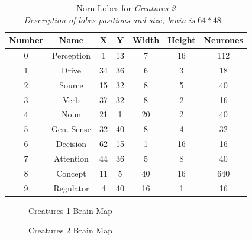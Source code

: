\documentclass[11pt,twoside,a4paper]{article}
\begin{document}
\begin{table}[ht]
	\begin{center} \begin{scriptsize}
	\begin{tabular}{|c|c|c|c|c|c|c|}
		\hline
	\rowcolor[gray]{0.75} 
	Number	&	Name	&	X	&	Y	&	Width	&	Height	&	Neurones \\ \hline
	0	&	Perception	&	1	&	13	&	7		&	16		&	112 \\ \hline
	1	&	Drive		&	34	&	36	&	6		&	3		&	18 \\ \hline
	2	&	Source		&	15	&	32	&	8		&	5		&	40 \\ \hline
	3	&	Verb		&	37	&	32	&	8		&	2		&	16 \\ \hline
	4	&	Noun		&	21	&	1	&	20		&	2		&	40 \\ \hline
	5	&	Gen. Sense	&	32	&	40	&	8		&	4		&	32 \\ \hline
	6	&	Decision	&	62	&	15	&	1		&	16		&	16 \\ \hline
	7	&	Attention	&	44	&	36	&	5		&	8		&	40 \\ \hline
	8	&	Concept		&	11	&	5	&	40		&	16		&	640 \\ \hline
	9	&	Regulator	&	4	&	40	&	16		&	1		&	16 \\ \hline
	\end{tabular}
	\end{scriptsize} \end{center}
	\caption[Norn Lobes for \emph{Creatures 2}]{Norn Lobes for \emph{Creatures 2} \\ \emph{Description of lobes positions and size,  brain is $64*48$~\cite{genornics}. } }
	\label{tab:nornsLobesPositionsCreatures2}
\end{table}


\begin{minipage}{0.5\textwidth}
\begin{figure}[H]
	\centerline {}
	\caption{Creatures 1 Brain Map~\cite{genornics}}
	\label{fig:Creatures1BrainMap}
\end{figure}
\end{minipage}
\begin{minipage}{0.1\textwidth}\end{minipage}
\begin{minipage}{0.5\textwidth}
\begin{figure}[H]
	\centerline {}
	\caption{Creatures 2 Brain Map~\cite{genornics}}
	\label{fig:Creatures2BrainMap}
\end{figure}
\end{minipage}
\end{document}
